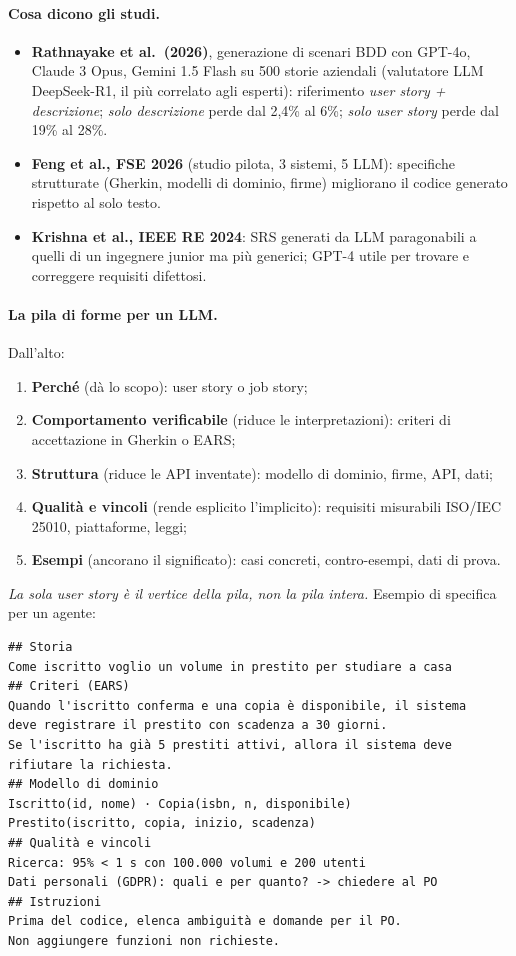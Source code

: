 \documentclass[a4paper,12pt]{article}
\begin{document}
\paragraph{Cosa dicono gli studi.}
\begin{itemize}
  \item \textbf{Rathnayake et al.\ (2026)}, generazione di scenari BDD con GPT-4o, Claude 3
        Opus, Gemini 1.5 Flash su 500 storie aziendali (valutatore LLM DeepSeek-R1, il più
        correlato agli esperti): riferimento \emph{user story + descrizione}; \emph{solo
        descrizione} perde dal 2,4\% al 6\%; \emph{solo user story} perde dal 19\% al 28\%.
  \item \textbf{Feng et al., FSE 2026} (studio pilota, 3 sistemi, 5 LLM): specifiche
        strutturate (Gherkin, modelli di dominio, firme) migliorano il codice generato
        rispetto al solo testo.
  \item \textbf{Krishna et al., IEEE RE 2024}: SRS generati da LLM paragonabili a quelli di un
        ingegnere junior ma più generici; GPT-4 utile per trovare e correggere requisiti
        difettosi.
\end{itemize}

\paragraph{La pila di forme per un LLM.} Dall'alto:
\begin{enumerate}[nosep]
  \item \textbf{Perché} (dà lo scopo): user story o job story;
  \item \textbf{Comportamento verificabile} (riduce le interpretazioni): criteri di
        accettazione in Gherkin o EARS;
  \item \textbf{Struttura} (riduce le API inventate): modello di dominio, firme, API, dati;
  \item \textbf{Qualità e vincoli} (rende esplicito l'implicito): requisiti misurabili
        ISO/IEC 25010, piattaforme, leggi;
  \item \textbf{Esempi} (ancorano il significato): casi concreti, contro-esempi, dati di prova.
\end{enumerate}
\emph{La sola user story è il vertice della pila, non la pila intera.} Esempio di specifica
per un agente:
\begin{verbatim}
## Storia
Come iscritto voglio un volume in prestito per studiare a casa
## Criteri (EARS)
Quando l'iscritto conferma e una copia è disponibile, il sistema
deve registrare il prestito con scadenza a 30 giorni.
Se l'iscritto ha già 5 prestiti attivi, allora il sistema deve
rifiutare la richiesta.
## Modello di dominio
Iscritto(id, nome) · Copia(isbn, n, disponibile)
Prestito(iscritto, copia, inizio, scadenza)
## Qualità e vincoli
Ricerca: 95% < 1 s con 100.000 volumi e 200 utenti
Dati personali (GDPR): quali e per quanto? -> chiedere al PO
## Istruzioni
Prima del codice, elenca ambiguità e domande per il PO.
Non aggiungere funzioni non richieste.
\end{verbatim}
\end{document}
